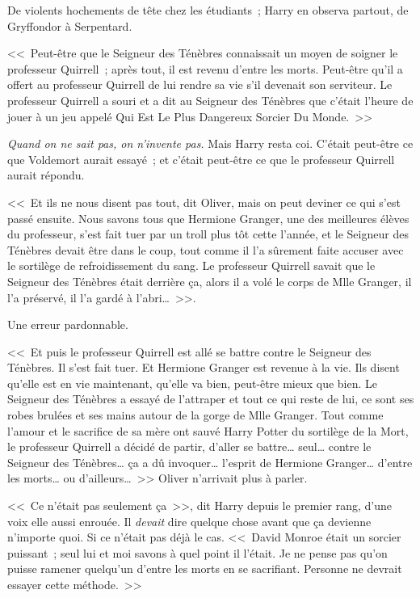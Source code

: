 De violents hochements de tête chez les étudiants~; Harry en observa partout, de Gryffondor à Serpentard.

<<~Peut-être que le Seigneur des Ténèbres connaissait un moyen de soigner le professeur Quirrell~; après tout, il est revenu d'entre les morts. Peut-être qu'il a offert au professeur Quirrell de lui rendre sa vie s'il devenait son serviteur. Le professeur Quirrell a souri et a dit au Seigneur des Ténèbres que c'était l'heure de jouer à un jeu appelé Qui Est Le Plus Dangereux Sorcier Du Monde.~>>

\emph{Quand on ne sait pas, on n'invente pas.} Mais Harry resta coi. C'était peut-être ce que Voldemort aurait essayé~; et c'était peut-être ce que le professeur Quirrell aurait répondu.

<<~Et ils ne nous disent pas tout, dit Oliver, mais on peut deviner ce qui s'est passé ensuite. Nous savons tous que Hermione Granger, une des meilleures élèves du professeur, s'est fait tuer par un troll plus tôt cette l'année, et le Seigneur des Ténèbres devait être dans le coup, tout comme il l'a sûrement faite accuser avec le sortilège de refroidissement du sang. Le professeur Quirrell savait que le Seigneur des Ténèbres était derrière ça, alors il a volé le corps de Mlle Granger, il l'a préservé, il l'a gardé à l'abri…~>>.

Une erreur pardonnable.

<<~Et puis le professeur Quirrell est allé se battre contre le Seigneur des Ténèbres. Il s'est fait tuer. Et Hermione Granger est revenue à la vie. Ils disent qu'elle est en vie maintenant, qu'elle va bien, peut-être mieux que bien. Le Seigneur des Ténèbres a essayé de l'attraper et tout ce qui reste de lui, ce sont ses robes brulées et ses mains autour de la gorge de Mlle Granger. Tout comme l'amour et le sacrifice de sa mère ont sauvé Harry Potter du sortilège de la Mort, le professeur Quirrell a décidé de partir, d'aller se battre… seul… contre le Seigneur des Ténèbres… ça a dû invoquer… l'esprit de Hermione Granger… d'entre les morts… ou d'ailleurs…~>> Oliver n'arrivait plus à parler.

<<~Ce n'était pas seulement ça~>>, dit Harry depuis le premier rang, d'une voix elle aussi enrouée. Il \emph{devait} dire quelque chose avant que ça devienne n'importe quoi. Si ce n'était pas déjà le cas. <<~David Monroe était un sorcier puissant~; seul lui et moi savons à quel point il l'était. Je ne pense pas qu'on puisse ramener quelqu'un d'entre les morts en se sacrifiant. Personne ne devrait essayer cette méthode.~>>

